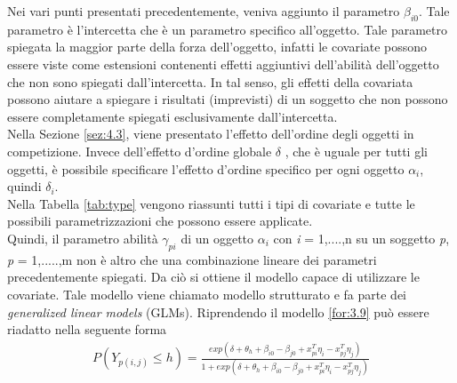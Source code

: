 Nei vari punti presentati precedentemente, veniva aggiunto il parametro $\beta_{i0}$. Tale parametro è l'intercetta che è un parametro specifico all'oggetto. Tale parametro spiegata la maggior parte della forza dell'oggetto, infatti le covariate possono essere viste come estensioni contenenti effetti aggiuntivi dell'abilità dell'oggetto che non sono spiegati dall'intercetta. In tal senso, gli effetti della covariata possono aiutare a spiegare i risultati (imprevisti) di un soggetto che non possono essere completamente spiegati esclusivamente dall'intercetta.\\
Nella Sezione \ref{sez:4.3}, viene presentato l'effetto dell'ordine degli oggetti in competizione. Invece dell'effetto d'ordine globale $\delta$ , che è uguale per tutti gli oggetti, è possibile specificare l'effetto d'ordine specifico per ogni oggetto $\alpha_i$, quindi $\delta_i$.\\
Nella Tabella \ref{tab:type} vengono riassunti tutti i tipi di covariate e tutte le possibili parametrizzazioni che possono essere applicate.\\
Quindi, il parametro abilità $\gamma_{pi}$ di un oggetto $\alpha_i$ con \emph{i} = 1,....,n su un soggetto \emph{p}, \emph{p} = 1,.....,m non è altro che una combinazione lineare dei parametri precedentemente spiegati. Da ciò si ottiene il modello capace di utilizzare le covariate. Tale modello viene chiamato modello strutturato e fa parte dei \emph{generalized linear models} (GLMs). Riprendendo il modello \ref{for:3.9} può essere riadatto nella seguente forma
\begin{align}
	P(Y_{p(i,j)}\leq h) =  \frac{exp(\delta + \theta_{h} + \beta_{i0} - \beta_{j0} + x^T_{pi}\eta_i - x^T_{pj}\eta_j)}{1 + exp(\delta + \theta_{h} + \beta_{i0} - \beta_{j0} + x^T_{pi}\eta_i - x^T_{pj}\eta_j)} \label{for:4.9}
\end{align}

